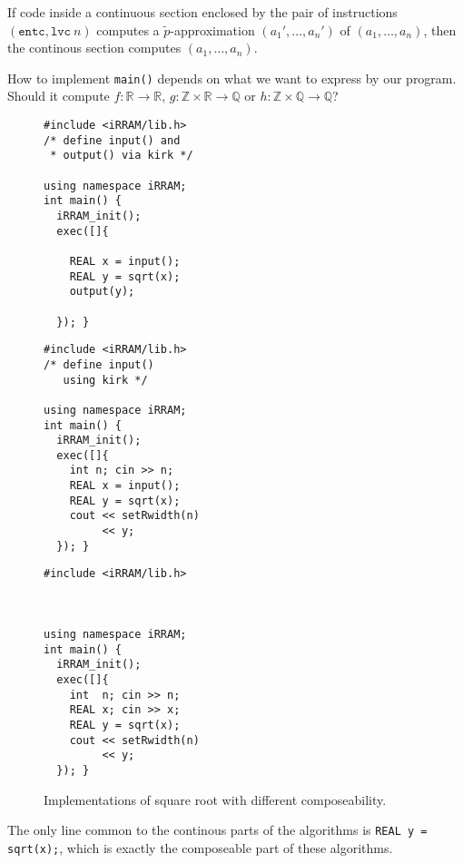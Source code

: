 \documentclass[a4paper,parskip=half]{scrartcl}
\begin{document}


If code inside a continuous section enclosed by the pair of instructions
$(\texttt{entc},\texttt{lvc}~n)$ computes a $\tilde p$-approximation
$(a_1',\ldots,a_n')$ of $(a_1,\ldots,a_n)$, then the continous section computes
$(a_1,\ldots,a_n)$.

\newpage

How to implement \verb!main()! depends on what we want to express by our
program. Should it compute $f:\mathbb R\to\mathbb R$,
$g:\mathbb Z\times\mathbb R\to\mathbb Q$ or
$h:\mathbb Z\times\mathbb Q\to\mathbb Q$?

\begin{figure}[h]
\small
\begin{minipage}[b]{.33\linewidth}
\begin{verbatim}
#include <iRRAM/lib.h>
/* define input() and
 * output() via kirk */

using namespace iRRAM;
int main() {
  iRRAM_init();
  exec([]{

    REAL x = input();
    REAL y = sqrt(x);
    output(y);

  }); }
\end{verbatim}
\end{minipage}%
\begin{minipage}[b]{.33\linewidth}
\begin{verbatim}
#include <iRRAM/lib.h>
/* define input()
   using kirk */

using namespace iRRAM;
int main() {
  iRRAM_init();
  exec([]{
    int n; cin >> n;
    REAL x = input();
    REAL y = sqrt(x);
    cout << setRwidth(n)
         << y;
  }); }
\end{verbatim}
\end{minipage}%
\begin{minipage}[b]{.33\linewidth}
\begin{verbatim}
#include <iRRAM/lib.h>



using namespace iRRAM;
int main() {
  iRRAM_init();
  exec([]{
    int  n; cin >> n;
    REAL x; cin >> x;
    REAL y = sqrt(x);
    cout << setRwidth(n)
         << y;
  }); }
\end{verbatim}
\end{minipage}
\caption{Implementations of square root with different composeability.}
\end{figure}
The only line common to the continous parts of the algorithms is
\verb!REAL y = sqrt(x);!, which is exactly the composeable part of these
algorithms.
\end{document}
